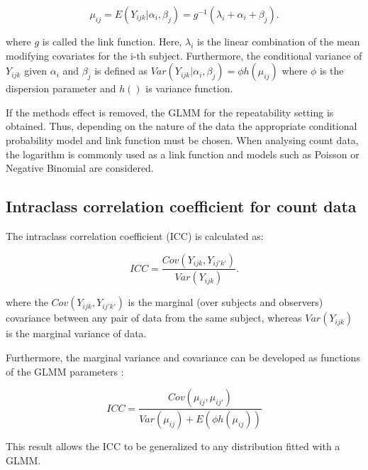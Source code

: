 \begin{equation}
\mu_{ij}=E\left(Y_{ijk}|\alpha_i,\beta_j\right)=g^{-1}\left(\lambda_i+\alpha_i+\beta_j\right).
\label{eq:glmm}
\end{equation}

where \(g\) is called the link function. Here, \(\lambda_i\) is the
linear combination of the mean modifying covariates for the i-th
subject. Furthermore, the conditional variance of \(Y_{ijk}\) given
\(\alpha_i\) and \(\beta_j\) is defined as
\(Var\left(Y_{ijk}|\alpha_i,\beta_j\right)=\phi h\left(\mu_{ij}\right)\)
where \(\phi\) is the dispersion parameter and \(h\left(\right)\) is
variance function.

If the methods effect is removed, the GLMM for the repeatability setting
is obtained. Thus, depending on the nature of the data the appropriate
conditional probability model and link function must be chosen. When
analysing count data, the logarithm is commonly used as a link function
and models such as Poisson or Negative Binomial are considered.

\hypertarget{intraclass-correlation-coefficient-for-count-data}{%
\subsection{Intraclass correlation coefficient for count
data}\label{intraclass-correlation-coefficient-for-count-data}}

The intraclass correlation coefficient (ICC) is calculated as:

\begin{equation}
ICC=\frac{Cov\left(Y_{ijk},Y_{ij'k'}\right)}{Var\left(Y_{ijk}\right)}.
\label{eq:icc}
\end{equation}

where the \(Cov\left(Y_{ijk},Y_{ij'k'}\right)\) is the marginal (over
subjects and observers) covariance between any pair of data from the
same subject, whereas \(Var\left(Y_{ijk}\right)\) is the marginal
variance of data.

Furthermore, the marginal variance and covariance can be developed as
functions of the GLMM parameters \citep{carrasco2010}:

\begin{equation}
ICC=\frac{Cov\left(\mu_{ij},\mu_{ij'}\right)}{Var\left(\mu_{ij}\right)+E\left(\phi h\left(\mu_{ij}\right)\right)}
\label{eq:icc2}
\end{equation}

This result allows the ICC to be generalized to any distribution fitted
with a GLMM.

